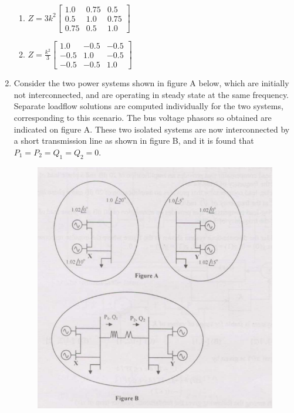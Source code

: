 \documentclass[journal]{IEEEtran}
\numberwithin{equation}{enumi}
\numberwithin{figure}{enumi}
\begin{document}
\begin{enumerate}
\begin{multicols}{2}
\begin{enumerate}
        \item $ Z = 3k^2 \begin{bmatrix} 1.0 & 0.75 & 0.5 \\ 0.5 & 1.0 & 0.75 \\ 0.75 & 0.5 & 1.0 \end{bmatrix} $
        \item $ Z = \frac{k^2}{3} \begin{bmatrix} 1.0 & -0.5 & -0.5 \\ -0.5 & 1.0 & -0.5 \\ -0.5 & -0.5 & 1.0 \end{bmatrix} $
    \end{enumerate}
    \end{multicols}
    \newpage
    \item Consider the two power systems shown in figure A below, which are initially not interconnected, and are operating in steady state at the same frequency. Separate loadflow solutions are computed individually for the two systems, corresponding to this scenario. The bus voltage phasors so obtained are indicated on figure A. These two isolated systems are now interconnected by a short transmission line as shown in figure B, and it is found that $P_1 = P_2 = Q_1 = Q_2 = 0$.
    \begin{figure}[!ht]
    \centering
    \includegraphics[width=\linewidth]{figs/15.png}

\end{figure}
\end{enumerate}
\end{document}

